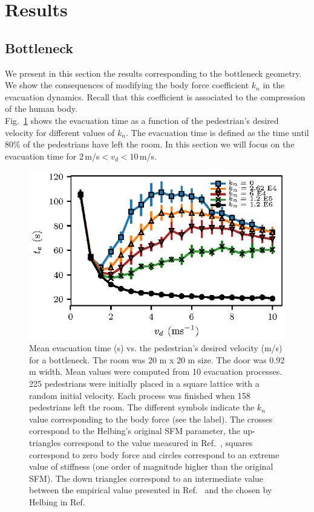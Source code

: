 \documentclass[preprint,12pt]{elsarticle}
\begin{document}
\section{\label{results}Results}


\subsection{\label{bottleneck} Bottleneck}


We present in this section the results corresponding to the bottleneck geometry. 
We show the consequences of modifying the body force coefficient $k_n$ in the 
evacuation dynamics. Recall that this coefficient is associated 
to the compression of the human body. \\

Fig.~\ref{vd_vs_te} shows the evacuation time as a function of the pedestrian's 
desired velocity for different values of $k_n$. The evacuation 
time is defined as the time until 80\% of the pedestrians have 
left the room. In this section we will focus on the evacuation time for 
$2\,$m/s$<v_d<10\,$m/s.\\


\begin{figure}[htbp!]
\centering
\includegraphics[width=0.7\columnwidth]
{./vd_vs_te_N225.eps}
\caption{\label{vd_vs_te}Mean evacuation time (s) vs. the pedestrian’s desired  
velocity (m/s) for a bottleneck. The room was 20 m x 20 m size. The door was 
0.92 m width. Mean values were computed from 10 evacuation processes. 225 
pedestrians were initially placed in a square lattice with a random initial 
velocity. Each process was finished when 158 pedestrians left the room. The 
different symbols indicate the $k_n$ value corresponding to the body force (see 
the label). The crosses correspond to the Helbing's original SFM parameter, the 
up-triangles correspond to the value measured in 
Ref.~\cite{melvin1988aatd}, squares correspond 
to zero body force and circles correspond to an extreme value of stiffness (one 
order of magnitude higher than the original SFM). The 
 down triangles correspond to an intermediate value between the empirical value 
presented in Ref.~\cite{melvin1988aatd} and the chosen by Helbing in 
Ref.~\cite{helbing_2000} }
\end{figure}
\end{document}
